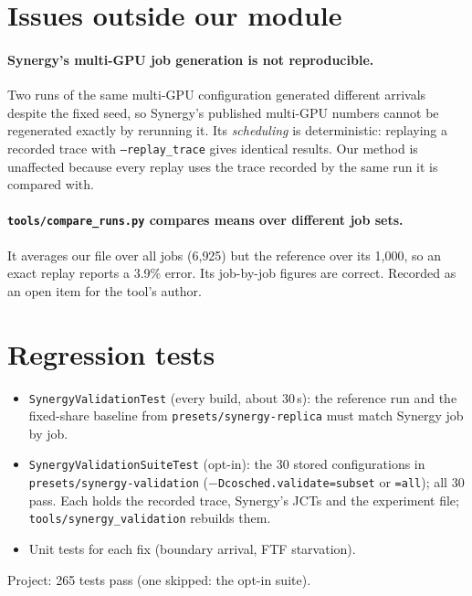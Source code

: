 \documentclass[11pt,a4paper]{article}
\newcommand{\code}[1]{\texttt{#1}}
\begin{document}
\section{Issues outside our module}

\paragraph{Synergy's multi-GPU job generation is not reproducible.} Two runs of the same multi-GPU configuration
generated different arrivals despite the fixed seed, so Synergy's published multi-GPU numbers cannot be
regenerated exactly by rerunning it. Its \emph{scheduling} is deterministic: replaying a recorded trace with
\code{--replay\_trace} gives identical results. Our method is unaffected because every replay uses the trace
recorded by the same run it is compared with.

\paragraph{\code{tools/compare\_runs.py} compares means over different job sets.} It averages our file over all
jobs (6{,}925) but the reference over its 1{,}000, so an exact replay reports a 3.9\% error. Its job-by-job figures
are correct. Recorded as an open item for the tool's author.

\section{Regression tests}

\begin{itemize}
  \item \code{SynergyValidationTest} (every build, about 30\,s): the reference run and the fixed-share baseline from
        \code{presets/synergy-replica} must match Synergy job by job.
  \item \code{SynergyValidationSuiteTest} (opt-in): the 30 stored configurations in
        \code{presets/synergy-validation} (\(-\)\code{Dcosched.validate=subset} or \code{=all}); all 30 pass. Each holds the
        recorded trace, Synergy's JCTs and the experiment file; \code{tools/synergy\_validation} rebuilds them.
  \item Unit tests for each fix (boundary arrival, FTF starvation).
\end{itemize}
Project: 265 tests pass (one skipped: the opt-in suite).
\end{document}
